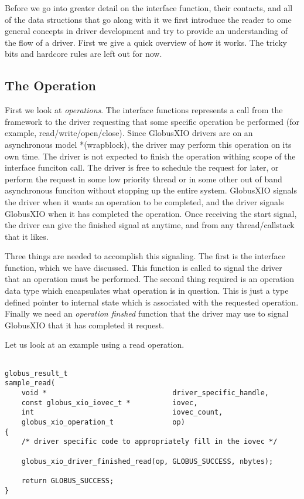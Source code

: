 \documentclass[11pt]{article}
\begin{document}
Before we go into greater detail on the interface function, their contacts,
and all of the data structions that go along with it we first introduce
the reader to ome general concepts in driver development and try to 
provide an understanding of the flow of a driver.
First we give a quick overview of how it works.  
The tricky bits and hardcore rules are left out for now.

\subsection{The Operation}
First we look at \emph{operations}.  The interface functions
represents a call from the framework to the driver requesting that some
specific operation be performed (for example, read/write/open/close).  
Since GlobusXIO drivers are on an 
asynchronous model *(wrapblock), the driver may perform 
this operation on its own time.  The driver
is not expected to finish the operation withing scope of the interface
funciton call.  The driver is free to schedule the request for later, 
or perform the request in some low priority thread or in some other out
of band asynchronous funciton without stopping up the entire system.
GlobusXIO signals the driver when it wants an operation
to be completed, and the driver signals GlobusXIO when it has 
completed the operation.  Once receiving the start signal, the driver
can give the finished signal at anytime, and from any thread/callstack
that it likes.

Three things are needed to accomplish this signaling.  The first is the
interface function, which we have discussed.  This function is called
to signal the driver that an operation must be performed.  The second
thing required is an operation data type which encapsulates what operation
is in question.  This is just a type defined pointer to internal state
which is associated with the requested operation.  Finally we need 
an \emph{operation finshed} function that the driver
may use to signal GlobusXIO that it has completed it request.

Let us look at an example using a read operation.

\begin{verbatim}

globus_result_t
sample_read(
    void *                              driver_specific_handle,
    const globus_xio_iovec_t *          iovec,
    int                                 iovec_count,
    globus_xio_operation_t              op)
{
    /* driver specific code to appropriately fill in the iovec */

    globus_xio_driver_finished_read(op, GLOBUS_SUCCESS, nbytes);

    return GLOBUS_SUCCESS;
}

\end{verbatim}
\end{document}
